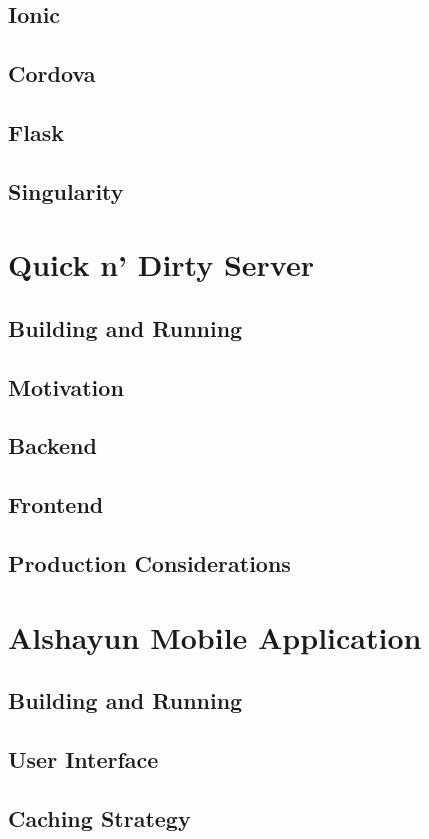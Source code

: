 \documentclass[12pt]{report}
\begin{document}
    \section{Ionic}
    \section{Cordova}
    \section{Flask}
    \section{Singularity}

\chapter{Quick n' Dirty Server}
    \section{Building and Running}
    \section{Motivation}
    \section{Backend}
    \section{Frontend}
    \section{Production Considerations}

\chapter{Alshayun Mobile Application}
    \section{Building and Running}
    \section{User Interface}
    \section{Caching Strategy}
\end{document}
